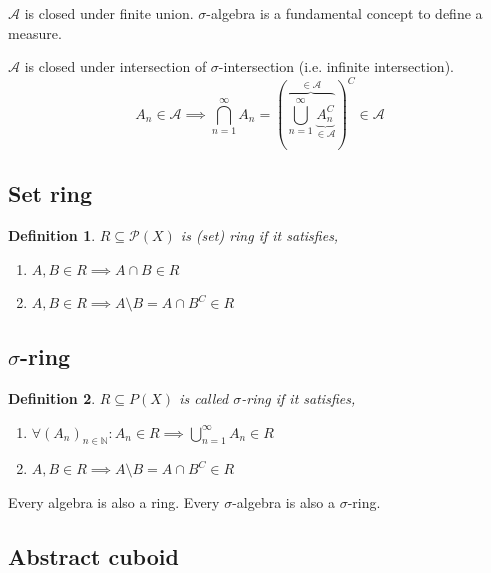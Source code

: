 \documentclass{article}
\newtheorem{definition}{Definition}  \numberwithin{definition}{section}
\begin{document}
$\mathcal A$ is closed under finite union.
$\sigma$-algebra is a fundamental concept to define a measure.

$\mathcal A$ is closed under intersection of $\sigma$-intersection (i.e. infinite intersection).
\[ A_n \in \mathcal A \implies \bigcap_{n=1}^\infty A_n = \left(\overbrace{\bigcup_{n=1}^\infty \underbrace{A_n^C}_{\in \mathcal A}}^{\in \mathcal A}\right)^C \in \mathcal A \]

\subsection{Set ring}

\begin{definition}
  $R \subseteq \mathcal P(X)$ is \emph{(set) ring} if it satisfies,
  \begin{enumerate}
    \item $A, B \in R \implies A \cap B \in R$
    \item $A, B \in R \implies A \setminus B = A \cap B^C \in R$
  \end{enumerate}
\end{definition}

\subsection[Sigma-ring]{$\sigma$-ring}

\begin{definition}
  $R \subseteq P(X)$ is called \emph{$\sigma$-ring} if it satisfies,
  \begin{enumerate}
    \item $\forall (A_n)_{n \in \mathbb N}: A_n \in R \implies \bigcup_{n=1}^\infty A_n \in R$
    \item $A, B \in R \implies A \setminus B = A \cap B^C \in R$
  \end{enumerate}
\end{definition}

Every algebra is also a ring. Every $\sigma$-algebra is also a $\sigma$-ring.

\subsection{Abstract cuboid}
\end{document}
